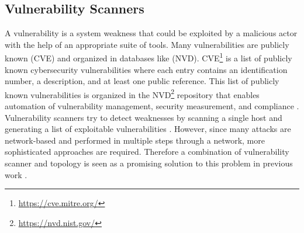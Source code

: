 \subsection{Vulnerability Scanners}
\label{chap:vulnerability_scanners}

 A vulnerability is a system weakness that could be exploited by a malicious actor with the help of an appropriate suite of tools. Many vulnerabilities are publicly known (CVE) and organized in databases like (NVD). CVE\footnote{\url{https://cve.mitre.org/}} is a list of publicly known cybersecurity vulnerabilities where each entry contains an identification number, a description, and at least one public reference. This list of publicly known vulnerabilities is organized in the  NVD\footnote{\url{https://nvd.nist.gov/}} repository that enables automation of vulnerability management, security measurement, and compliance \cite{booth2013national}. Vulnerability scanners try to detect weaknesses by scanning a single host and generating a list of exploitable vulnerabilities \cite{deraison1999nessus, farmer1990cops}. However, since many attacks are network-based and performed in multiple steps through a network, more sophisticated approaches are required. Therefore a combination of vulnerability scanner and topology is seen as a promising solution to this problem in previous work \cite{sheyner2002automated, ingols2006practical}.
